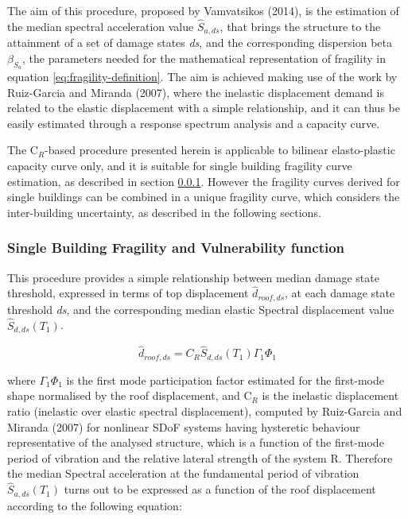 The aim of this procedure, proposed by Vamvatsikos (2014), is the estimation of the median spectral acceleration value $\hat{S}_{a,ds}$, that brings the structure to the attainment of a set of damage states \textit{ds}, and the corresponding dispersion beta $\beta_{S_a}$, the parameters needed for the mathematical representation of fragility in equation \ref{eq:fragility-definition}. The aim is achieved making use of the work by Ruiz-Garcia and Miranda (2007), where the inelastic displacement demand is related to the elastic displacement with a simple relationship, and it can thus be easily estimated through a response spectrum analysis and a capacity curve.

The C$_R$-based procedure presented herein is applicable to bilinear elasto-plastic capacity curve only, and it is suitable for single building fragility curve estimation, as described in section \ref{subsubsec:single-building}. However the fragility curves derived for single buildings can be combined in a unique fragility curve, which considers the inter-building uncertainty, as described in the following sections.

\subsubsection{Single Building Fragility and Vulnerability function}
\label{subsubsec:single-building}
This procedure provides a simple relationship between median damage state threshold, expressed in terms of top displacement $\hat{d}_{roof, ds}$, at each damage state threshold \textit{ds}, and the corresponding median elastic Spectral displacement value $\hat{S}_{d,ds}(T_1)$.

\begin{equation}
\hat{d}_{roof, ds} = C_R \hat{S}_{d, ds}(T_1) \Gamma_1 \Phi_1
\end{equation}

where $\Gamma_1 \Phi_1$ is the first mode participation factor estimated for the first-mode shape normalised by the roof displacement, and C$_R$ is the inelastic displacement ratio (inelastic over elastic spectral displacement), computed by Ruiz-Garcia and Miranda (2007) for nonlinear SDoF systems having hysteretic behaviour representative of the analysed structure, which is a function of the first-mode period of vibration and the relative lateral strength of the system R. Therefore the median Spectral acceleration at the fundamental period of vibration $\hat{S}_{a,ds}(T_1)$ turns out to be expressed as a function of the roof displacement according to the following equation:

